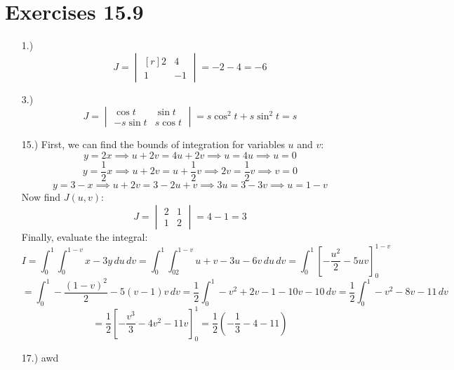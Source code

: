 \documentclass[12pt]{article}
\newcommand{\bracks}[1]{\left[#1\right]}
\newcommand{\parns}[1]{\left(#1\right)}
\begin{document}
\section*{Exercises 15.9}
\begin{itemize}
    \item [1.)] \[J=\begin{vmatrix*}[r]
        2 & 4 \\
        1 & -1
    \end{vmatrix*}=-2-4=-6\]

    \item [3.)] \[J=\begin{vmatrix*}
        \cos t & \sin t \\
        -s\sin t & s\cos t
    \end{vmatrix*}=s\cos^2t+s\sin^2t=s\]

    \item [15.)] First, we can find the bounds of integration for variables $u$ and $v$:
    \[y=2x\implies u+2v=4u+2v\implies u=4u\implies u=0\]
    \[y=\frac{1}{2}x\implies u+2v=u+\frac{1}{2}v\implies 2v=\frac{1}{2}v\implies v=0\]
    \[y=3-x\implies u+2v=3-2u+v\implies 3u=3-3v\implies u=1-v\]
    Now find $J(u,v)$:
    \[J=\begin{vmatrix*}
        2 & 1 \\
        1 & 2
    \end{vmatrix*}=4-1=3\]
    Finally, evaluate the integral:
    \[I=\int^1_0\int^{1-v}_0x-3y\,du\,dv=\int^1_0\int^{1-v}_02u+v-3u-6v\,du\,dv=\int^1_0\bracks{-\frac{u^2}{2}-5uv}^{1-v}_0\]
    \[=\int^1_0-\frac{(1-v)^2}{2}-5(v-1)v\,dv=\frac{1}{2}\int^1_0-v^2+2v-1-10v-10\,dv=\frac{1}{2}\int^1_0-v^2-8v-11\,dv\]
    \[=\frac{1}{2}\bracks{-\frac{v^3}{3}-4v^2-11v}^1_0=\frac{1}{2}\parns{-\frac{1}{3}-4-11}\]

    \item [17.)] awd

\end{itemize}
\end{document}
